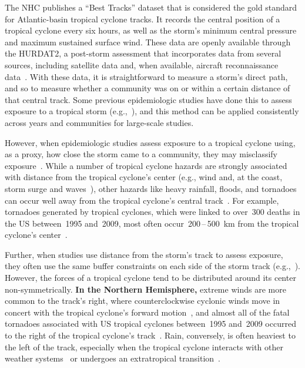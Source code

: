 The \ac{NHC} publishes a ``Best Tracks'' dataset that is considered the gold
standard for Atlantic-basin tropical cyclone tracks.  It records the central
position of a tropical cyclone every six hours, as well as the storm's minimum
central pressure and maximum sustained surface wind.  These data are openly
available through the \ac{HURDAT2}, a post-storm assessment that incorporates
data from several sources, including satellite data and, when available,
aircraft reconnaissance data~\parencite{landsea2013, jarvinen1988}.  With these
data, it is straightforward to measure a storm's direct path, and so to measure
whether a community was on or within a certain distance of that central track.
Some previous epidemiologic studies have done this to assess exposure to a
tropical storm (e.g.,~\cite{currie2013, kinney2008, caillouet2008increase}), 
and this method can be applied consistently across years and communities 
for large-scale studies.

However, when epidemiologic studies assess exposure to a tropical cyclone
using, as a proxy, how close the storm came to a community, they may
misclassify exposure~\parencite{grabich2015measuring}. While a number of
tropical cyclone hazards are strongly associated with distance from the
tropical cyclone's center (e.g., wind and, at the coast, storm surge and
waves~\parencite{rappaport2000, kruk2010}), other hazards like heavy rainfall,
floods, and tornadoes can occur well away from the tropical cyclone's central
track~\parencite{rappaport2000, atallah2007, moore2012}.  For example,
tornadoes generated by tropical cyclones, which were linked to over~300 deaths
in the \ac{US} between~1995 and~2009, most often
occur~200\,--\,500~\si{\kilo\metre} from the tropical cyclone's
center~\parencite{moore2012}.  

Further, when studies use distance from the storm's track to assess exposure,
they often use the same buffer constraints on each side of the storm track
(e.g.,~\cite{kinney2008, currie2013}).  However, the forces of a tropical
cyclone tend to be distributed around its center non-symmetrically.  \textbf{In
the Northern Hemisphere,} extreme winds are more common to the track's right,
where counterclockwise cyclonic winds move in concert with the tropical
cyclone's forward motion~\parencite{halverson2015}, and almost all of the fatal
tornadoes associated with \ac{US} tropical cyclones between~1995 and~2009
occurred to the right of the tropical cyclone's track~\parencite{moore2012}.
Rain, conversely, is often heaviest to the left of the track, especially when
the tropical cyclone interacts with other weather
systems~\parencite{atallah2003, atallah2007, zhu2013variations} or undergoes an
extratropical transition~\parencite{elsberry2002}.  

